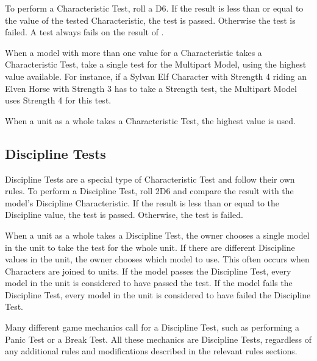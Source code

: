 To perform a Characteristic Test, roll a D6. If the result is less than or equal to the value of the  tested Characteristic, the test is passed. Otherwise the test is failed. A test always fails on the result of .

When a model with more than one value for a Characteristic takes a Characteristic Test, take a single test for the Multipart Model, using the highest value available. For instance, if a Sylvan Elf Character with Strength 4 riding an Elven Horse with Strength 3 has to take a Strength test, the Multipart Model uses Strength 4 for this test.

When a unit as a whole takes a Characteristic Test, the highest value is used.

\subsection{Discipline Tests}
\label{discipline_tests}

Discipline Tests are a special type of Characteristic Test and follow their own rules. To perform a Discipline Test, roll 2D6 and compare the result with the model's Discipline Characteristic. If the result is less than or equal to the Discipline value, the test is passed. Otherwise, the test is failed.

When a unit as a whole takes a Discipline Test, the owner chooses a single model in the unit to take the test for the whole unit. If there are different Discipline values in the unit, the owner chooses which model to use. This often occurs when Characters are joined to units. If the model passes the Discipline Test, every model in the unit is considered to have passed the test. If the model fails the Discipline Test, every model in the unit is considered to have failed the Discipline Test.

Many different game mechanics call for a Discipline Test, such as performing a Panic Test or a Break Test. All these mechanics are Discipline Tests, regardless of any additional rules and modifications described in the relevant rules sections.
